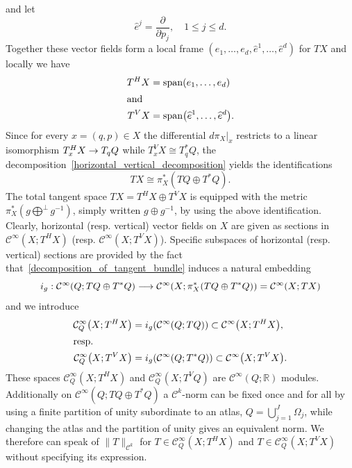 \documentclass[10pt]{amsart}
\theoremstyle{definition}\newtheorem{defi}[theo]{Definition}\newtheorem{rema}[theo]{Remark}\newtheorem{exam}[theo]{Example}\newtheorem{exem}[theo]{Example}\newtheorem{nota}[theo]{Notation}
\newcommand{\R}{\mathbb{R}}
\newcommand{\clC}{\mathcal{C}}
\newcommand{\p}{\partial}
\DeclareMathOperator{\spann}{span}
\let\originalleft\left
\let\originalright\right
\renewcommand{\left}{\mathopen{}\mathclose\bgroup\originalleft}
\renewcommand{\right}{\aftergroup\egroup\originalright}
\renewcommand*{\to}{\mathchoice{\longrightarrow}{\rightarrow}{\rightarrow}{\rightarrow}}
\begin{document}
and let
\begin{equation}\label{definiton_hat_e_j}
\widehat{e}^j = \frac{\p}{\p p_j}, \quad 1 \le j \le d.
\end{equation}
Together these vector fields form a local frame $(e_1, \dots, e_d, \widehat{e}^1, \dots, \widehat{e}^d)$ for $TX$ and locally we have
\begin{align}
T^H X &= \spann \left(e_1, \dots, e_d \right)
\\
\intertext{and}
T^V X &= \spann \left(\widehat{e}^1, \dots, \widehat{e}^d\right).
\end{align}
Since for every $x = (q,p) \in X$ the differential $d \pi_X|_x$ restricts to a linear isomorphism $T^H_x X \to T_q Q$ while $T^V_x X \cong T^*_q Q$, the decomposition~\eqref{horizontal_vertical_decomposition} yields the identifications
\begin{equation}\label{decomposition_of_tangent_bundle}
TX \cong \pi_{X}^{*}(TQ \oplus T^* Q).
\end{equation}
The total tangent space $TX=T^{H}X\oplus T^{V}X$ is equipped with the metric $\pi_{X}^{*}(g\bigoplus^{\perp}\!g^{-1})$, simply written $g\oplus g^{-1}$, by using the above identification. Clearly, horizontal (resp. vertical) vector fields on $X$ are given as sections in $\clC^{\infty}(X;T^{H}X)$ (resp. $\clC^{\infty}(X;T^{V}X)$). Specific subspaces of horizontal (resp. vertical) sections are provided by the fact that~\eqref{decomposition_of_tangent_bundle} induces a natural embedding
\[
i_{g}:\clC^{\infty}(Q;TQ\oplus T^{*}Q)\to \clC^{\infty}\left(X;\pi^{*}_{X}(TQ\oplus T^{*}Q)\right)=\clC^{\infty}(X;TX)
\]
and we introduce
\begin{align*}
 \clC^{\infty}_{Q}\left(X;T^{H}X\right)&=i_{g}(\clC^{\infty}(Q;TQ))\subset \clC^{\infty}\left(X;T^{H}X\right),\\
\intertext{resp.} \clC^{\infty}_{Q}\left(X;T^{V}X\right)&=i_{g}(\clC^{\infty}(Q;T^{*}Q))\subset \clC^{\infty}\left(X;T^{V}X\right).
\end{align*}
These spaces $\clC^{\infty}_{Q}(X;T^{H}X)$ and $\clC^{\infty}_{Q}(X;T^{V}Q)$ are $\clC^{\infty}(Q;\R)$ modules. Additionally on $\clC^{\infty}(Q;TQ\oplus T^{*}Q)$ a $\clC^{k}$-norm can be fixed once and for all by using a finite partition of unity subordinate to an atlas, $Q=\bigcup_{j=1}^{J}\Omega_{j}$, while changing the atlas and the partition of unity gives an equivalent norm. We therefore can speak of $\|T\|_{\clC^{k}}$ for $T\in \clC^{\infty}_{Q}(X;T^{H}X)$ and $T\in \clC^{\infty}_{Q}(X;T^{V}X)$ without specifying its expression.
\end{document}
